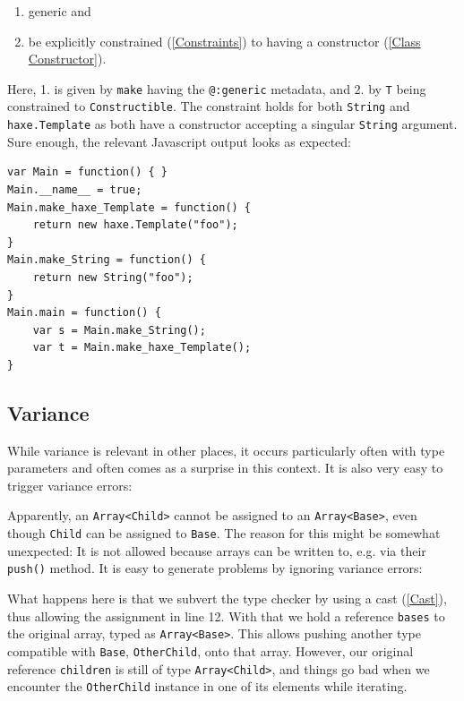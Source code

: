 \documentclass{article}
\newcommand{\target}[1]{#1}
\newcommand{\type}[1]{\texttt{#1}}
\newcommand{\expr}[1]{\texttt{#1}}
\newcommand{\tref}[2]{#1 (\ref{#2})}
\newcommand{\haxe}[2][]{%
}
\begin{document}
\begin{enumerate}
	\item generic and
	\item be explicitly \tref{constrained}{Constraints} to having a \tref{constructor}{Class Constructor}.
\end{enumerate}

Here, 1. is given by \expr{make} having the \expr{@:generic} metadata, and 2. by \type{T} being constrained to \type{Constructible}. The constraint holds for both \type{String} and \type{haxe.Template} as both have a constructor accepting a singular \type{String} argument. Sure enough, the relevant \target{Javascript} output looks as expected:

\begin{lstlisting}
var Main = function() { }
Main.__name__ = true;
Main.make_haxe_Template = function() {
	return new haxe.Template("foo");
}
Main.make_String = function() {
	return new String("foo");
}
Main.main = function() {
	var s = Main.make_String();
	var t = Main.make_haxe_Template();
}
\end{lstlisting}

\subsection{Variance}
\label{Variance}

While variance is relevant in other places, it occurs particularly often with type parameters and often comes as a surprise in this context. It is also very easy to trigger variance errors:

\haxe{assets/Variance.hx}

Apparently, an \type{Array<Child>} cannot be assigned to an \type{Array<Base>}, even though \type{Child} can be assigned to \type{Base}. The reason for this might be somewhat unexpected: It is not allowed because arrays can be written to, e.g. via their \expr{push()} method. It is easy to generate problems by ignoring variance errors:

\haxe{assets/Variance2.hx}

What happens here is that we subvert the type checker by using a \tref{cast}{Cast}, thus allowing the assignment in line 12. With that we hold a reference \expr{bases} to the original array, typed as \type{Array<Base>}. This allows pushing another type compatible with \type{Base}, \type{OtherChild}, onto that array. However, our original reference \expr{children} is still of type \type{Array<Child>}, and things go bad when we encounter the \type{OtherChild} instance in one of its elements while iterating.
\end{document}
